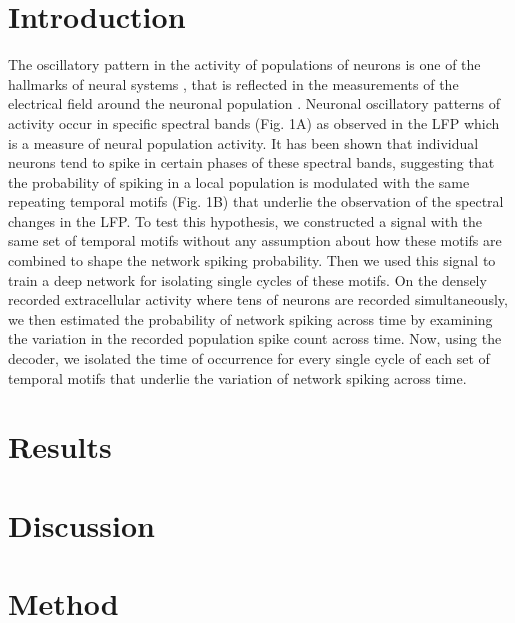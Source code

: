 \documentclass{article}
\begin{document}
\section{Introduction}
The oscillatory pattern in the activity of populations of neurons is one of the hallmarks of neural systems \citep{Buzsaki2006RhythmsBrain}, that is reflected in the measurements of the electrical field around the neuronal population \citep{Buzsaki2012TheSpikes}. Neuronal oscillatory patterns of activity occur in specific spectral bands (Fig. 1A) as observed in the LFP which is a measure of neural population activity. It has been shown that individual neurons tend to spike in certain phases of these spectral bands, suggesting that the probability of spiking in a local population is modulated with the same repeating temporal motifs (Fig. 1B) that underlie the observation of the spectral changes in the LFP. To test this hypothesis, we constructed a signal with the same set of temporal motifs without any assumption about how these motifs are combined to shape the network spiking probability. Then we used this signal to train a deep network for isolating single cycles of these motifs. On the densely recorded extracellular activity where tens of neurons are recorded simultaneously, we then estimated the probability of network spiking across time by examining the variation in the recorded population spike count across time. Now, using the decoder, we isolated the time of occurrence for every single cycle of each set of temporal motifs that underlie the variation of network spiking across time.

\section{Results}

\section{Discussion}

\section{Method}

\newpage


\end{document}
